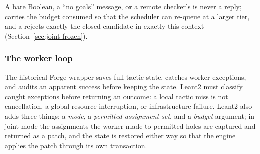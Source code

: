 A bare Boolean, a ``no goals'' message, or a remote checker's  is never a reply;  carries the budget consumed so that the scheduler can re-queue at a larger tier, and a  rejects exactly the closed candidate in exactly this context (Section~\ref{sec:joint-frozen}).

\subsubsection{The worker loop}

The historical Forge wrapper saves full tactic state, catches worker exceptions, and audits an apparent success before keeping the state. Leant2 must classify caught exceptions before returning an outcome: a local tactic miss is not cancellation, a global resource interruption, or infrastructure failure. Leant2 also adds three things: a \emph{mode}, a \emph{permitted assignment set}, and a \emph{budget} argument; in joint mode the assignments the worker made to permitted holes are captured and returned as a patch, and the state is restored either way so that the engine applies the patch through its own transaction.
